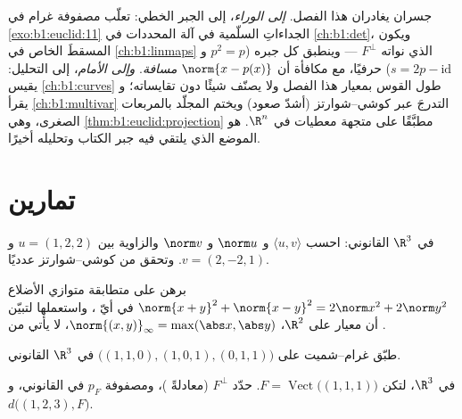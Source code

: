 \begin{remark}
\label{rem:b1:euclid:perspectives}
جسران يغادران هذا الفصل. \emph{إلى الوراء}، إلى الجبر
الخطي: تعلّب مصفوفة غرام في \cref{exo:b1:euclid:11}
الجداءاتِ السلّمية في آلة المحددات في
\cref{ch:b1:det}، ويكون  المسقطَ الخاص
في \cref{ch:b1:linmaps} الذي نواته
$F^\perp$ --- وينطبق كل جبره ($p^2 = p$ و $s = 2p -
\mathrm{id}$) حرفيًا، مع مكافأة أن $\norm{x
- p(x)}$ \emph{مسافة}. \emph{وإلى الأمام}، إلى التحليل:
يقيس \cref{ch:b1:curves} طول القوس بمعيار هذا الفصل
ولا يصنّف شيئًا دون تقايساته؛ و
يقرأ \cref{ch:b1:multivar} التدرجَ عبر
كوشي--شوارتز (أشدّ صعود) ويختم المجلّد بالمربعات
الصغرى، وهي \cref{thm:b1:euclid:projection} مطبَّقًا
على متجهة معطيات في $\R^n$.  هو الموضع
الذي يلتقي فيه جبر الكتاب وتحليله أخيرًا.
\end{remark}

\section{تمارين}

\begin{exercise}[$\star$]\label{exo:b1:euclid:1}
في $\R^3$ القانوني: احسب $\langle u, v\rangle$ و $\norm u$ و
$\norm v$ والزاوية بين $u = (1, 2, 2)$ و $v = (2, -2,
1)$. وتحقق من كوشي--شوارتز عدديًا.
\end{exercise}

\begin{exercise}[$\star$]\label{exo:b1:euclid:2}
برهن على متطابقة متوازي الأضلاع $\norm{x+y}^2 + \norm{x-y}^2 =
2\norm x^2 + 2\norm y^2$ في أيّ ، واستعملها لتبيّن
أن معيار  على $\R^2$، $\norm{(x,y)}_\infty = \max(\abs x,
\abs y)$، لا يأتي من .
\end{exercise}

\begin{exercise}[$\star$]\label{exo:b1:euclid:3}
طبّق غرام--شميت على $\bigl((1,1,0), (1,0,1), (0,1,1)\bigr)$ في
$\R^3$ القانوني.
\end{exercise}

\begin{exercise}[$\star$]\label{exo:b1:euclid:4}
في $\R^3$، لتكن $F = \operatorname{Vect}\bigl((1,1,1)\bigr)$.
حدّد $F^\perp$ (معادلةً )، ومصفوفة $p_F$ في
 القانوني، و $d\bigl((1, 2, 3), F\bigr)$.
\end{exercise}

